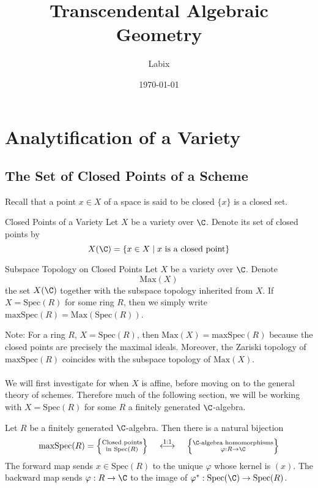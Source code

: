 \documentclass[a4paper]{article}
\title{Transcendental Algebraic Geometry}
\author{Labix}
\date{\today}
\begin{document}
\maketitle
\begin{abstract}
\end{abstract}
\pagebreak
\tableofcontents

\pagebreak

\section{Analytification of a Variety}
\subsection{The Set of Closed Points of a Scheme}
Recall that a point $x\in X$ of a space is said to be closed $\{x\}$ is a closed set. 

\begin{defn}{Closed Points of a Variety}{} Let $X$ be a variety over $\C$. Denote its set of closed points by $$X(\C)=\{x\in X\;|\;x\text{ is a closed point}\}$$
\end{defn}

\begin{defn}{Subspace Topology on Closed Points}{} Let $X$ be a variety over $\C$. Denote $$\text{Max}(X)$$ the set $X(\C)$ together with the subspace topology inherited from $X$. If $X=\text{Spec}(R)$ for some ring $R$, then we simply write $\text{maxSpec}(R)=\text{Max}(\text{Spec}(R))$. 
\end{defn}

Note: For a ring $R$, $X=\text{Spec}(R)$, then $\text{Max}(X)=\text{maxSpec}(R)$ because the closed points are precisely the maximal ideals. Moreover, the Zariski topology of $\text{maxSpec}(R)$ coincides with the subspace topology of $\text{Max}(X)$. \\~\\

We will first investigate for when $X$ is affine, before moving on to the general theory of schemes. Therefore much of the following section, we will be working with $X=\text{Spec}(R)$ for some $R$ a finitely generated $\C$-algebra. 

\begin{thm}{}{} Let $R$ be a finitely generated $\C$-algebra. Then there is a natural bijection $$\text{maxSpec}(R)=\left\{\substack{\text{Closed points}\\\text{in Spec}(R)}\right\}\;\;\;\;\overset{1:1}{\longleftrightarrow}\;\;\;\;\left\{\substack{\C\text{-algebra homomorphisms}\\\varphi:R\to\C}\right\}$$ The forward map sends $x\in\text{Spec}(R)$ to the unique $\varphi$ whose kernel is $(x)$. The backward map sends $\varphi:R\to\C$ to the image of $\varphi^\ast:\text{Spec}(\C)\to\text{Spec}(R)$. 
\end{thm}
\end{document}
